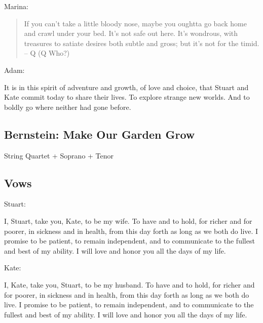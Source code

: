\documentclass[twoside]{article}
\begin{document}
        \begin{center}
          Marina:
        \end{center}
        \begin{quote} 
          If you can't take a little bloody nose, maybe you oughtta go back home and crawl under your bed. It's not safe out here. It's wondrous, with treasures to satiate desires both subtle and gross; but it's not for the timid.
          -- Q (Q Who?)
        \end{quote}

        \begin{center}
          Adam:
        \end{center}

It is in this spirit of adventure and growth, of love and choice, that Stuart and Kate commit today to share their lives. To explore strange new worlds. And to boldly go where neither had gone before.

      \subsection{Bernstein: Make Our Garden Grow}
        \begin{center}
         String Quartet + Soprano + Tenor
        \end{center}

  	   \subsection{Vows}
         \begin{center}
           Stuart:
         \end{center}
          
I, Stuart, take you, Kate, to be my wife. To have and to hold, for richer and for poorer, in sickness and in health, from this day forth as long as we both do live. I promise to be patient, to remain independent, and to communicate to the fullest and best of my ability. I will love and honor you all the days of my life.
	
          \begin{center}
           Kate:
          \end{center}
          
I, Kate, take you, Stuart, to be my husband. To have and to hold, for richer and for poorer, in sickness and in health, from this day forth as long as we both do live. I promise to be patient, to remain independent, and to communicate to the fullest and best of my ability. I will love and honor you all the days of my life.
\end{document}
